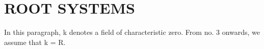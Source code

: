 \section{ROOT SYSTEMS}

In this paragraph, k denotes a field of characteristic zero. From no. 3 onwards, we assume that k = R.
\relax{}
